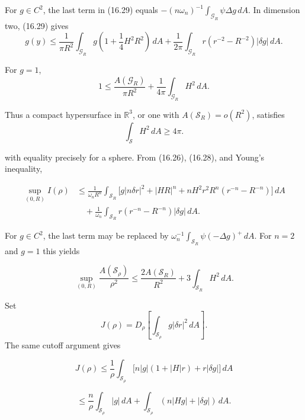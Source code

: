 For $g\in C^2$, the last term in (16.29) equals
$-(n\omega_n)^{-1}\int_{\mathcal G_R}\psi\Delta g\,dA$.
In dimension two, (16.29) gives
\begin{equation}
g(y)\le \frac{1}{\pi R^2}\int_{\mathcal{G}_R} g\left(1+\frac14 H^2R^2\right)\,dA
+\frac{1}{2\pi}\int_{\mathcal{G}_R} r(r^{-2}-R^{-2})|\delta g|\,dA.
\tag{16.30}
\end{equation}

For $g=1$,
\begin{equation}
1\le \frac{A(\mathcal{G}_R)}{\pi R^2}+\frac{1}{4\pi}\int_{\mathcal{G}_R} H^2\,dA.
\tag{16.31}
\end{equation}

Thus a compact hypersurface in $\mathbb R^3$, or one with
$A(\mathcal S_R)=o(R^2)$, satisfies
\begin{equation}
\int_{\mathcal{S}} H^2\,dA \geq 4\pi.
\tag{16.32}
\end{equation}

with equality precisely for a sphere.  From (16.26), (16.28), and Young's
inequality,

\begin{equation}
\tag{16.33}
\begin{aligned}
\sup_{(0,R)} I(\rho)&\leq \frac{1}{\omega_n R^n}\int_{\mathcal{S}_R}\big[g|n\delta r|^2+|HR|^n+nH^2r^2R^n(r^{-n}-R^{-n})\big]\,dA\\
&\quad+\frac{1}{\omega_n}\int_{\mathcal{S}_R} r(r^{-n}-R^{-n})|\delta g|\,dA.
\end{aligned}
\end{equation}

For $g\in C^2$, the last term may be replaced by
$\omega_n^{-1}\int_{\mathcal S_R}\psi(-\Delta g)^+\,dA$.
For $n=2$ and $g=1$ this yields

\begin{equation}
\sup_{(0,R)} \frac{A(\mathcal{S}_\rho)}{\rho^2}\leq \frac{2A(\mathcal{S}_R)}{R^2}+3\int_{\mathcal{S}_R} H^2\,dA.
\tag{16.34}
\end{equation}

Set
\[
J(\rho)=D_\rho\left[\int_{\mathcal{S}_\rho} g|\delta r|^2\,dA\right].
\]
The same cutoff argument gives

\begin{equation}
J(\rho)\le \frac{1}{\rho}\int_{\mathcal S_{\rho}}\bigl[n|g|(1+|H|r)+r|\delta g|\bigr]\,dA
\tag{16.35}
\end{equation}

\[
\le \frac{n}{\rho}\int_{\mathcal S_{\rho}}|g|\,dA+\int_{\mathcal S_{\rho}}(n|Hg|+|\delta g|)\,dA.
\]

